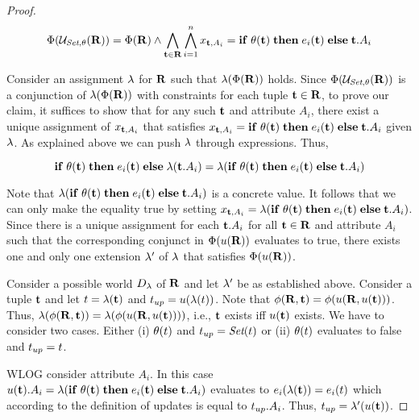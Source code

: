 {\begin{proof}
\begin{align}
  \label{}
\Phi(\mathcal{U}_{\textit{Set},\theta}(\mathbf{R})) = \Phi(\mathbf{R}) \land \bigwedge_{\mathbf{t} \in \mathbf{R}} \bigwedge_{i=1}^{n} x_{\mathbf{t},A_i} = \mathbf{if}\thickspace \theta(\mathbf{t}) \thickspace \mathbf{then} \thickspace e_i(\mathbf{t}) \thickspace \mathbf{else} \thickspace \mathbf{t}.A_i
\end{align}

Consider an assignment $\lambda$ for $\mathbf{R}$ such that $\lambda(\Phi(\mathbf{R}))$ holds. Since $\Phi(\mathcal{U}_{\textit{Set},\theta}(\mathbf{R}))$ is a conjunction of $\lambda(\Phi(\mathbf{R}))$ with constraints for each tuple $\mathbf{t} \in \mathbf{R}$, to prove our claim, it suffices to show that for any such $\mathbf{t}$ and attribute $A_i$, there exist a unique assignment of $x_{\mathbf{t},A_i}$ that satisfies $x_{\mathbf{t},A_i} = \mathbf{if}\thickspace \theta(\mathbf{t}) \thickspace \mathbf{then} \thickspace e_i(\mathbf{t}) \thickspace \mathbf{else} \thickspace \mathbf{t}.A_i$ given $\lambda$. As explained above we can push $\lambda$ through expressions. Thus,

\[
  \mathbf{if}\thickspace \theta(\mathbf{t}) \thickspace \mathbf{then} \thickspace e_i(\mathbf{t}) \thickspace \mathbf{else} \thickspace \lambda(\mathbf{t}.A_i) = \lambda(\mathbf{if}\thickspace \theta(\mathbf{t}) \thickspace \mathbf{then} \thickspace e_i(\mathbf{t}) \thickspace \mathbf{else} \thickspace \mathbf{t}.A_i)
\]

Note that $\lambda(\mathbf{if}\thickspace \theta(\mathbf{t}) \thickspace \mathbf{then} \thickspace e_i(\mathbf{t}) \thickspace \mathbf{else} \thickspace \mathbf{t}.A_i)$ is a concrete value. It follows that we can only make the equality true by setting $x_{\mathbf{t},A_i} = \lambda(\mathbf{if}\thickspace \theta(\mathbf{t}) \thickspace \mathbf{then} \thickspace e_i(\mathbf{t}) \thickspace \mathbf{else} \thickspace \mathbf{t}.A_i)$. Since there is a unique assignment for each $\mathbf{t}.A_i$ for all $\mathbf{t} \in \mathbf{R}$ and attribute $A_i$ such that the corresponding conjunct in $\Phi(u(\mathbf{R}))$ evaluates to true, there exists one and only one extension $\lambda'$ of $\lambda$ that satisfies $\Phi(u(\mathbf{R}))$.

Consider a possible world $D_{\lambda}$ of $\mathbf{R}$ and let $\lambda'$ be as established above. Consider a tuple $\mathbf{t}$ and let $t = \lambda(\mathbf{t})$ and $t_{up} = u(\lambda(t))$. Note that $\phi(\mathbf{R},\mathbf{t}) = \phi(u(\mathbf{R},u(\mathbf{t})))$. Thus, $\lambda(\phi(\mathbf{R},\mathbf{t})) = \lambda(\phi(u(\mathbf{R},u(\mathbf{t}))))$, i.e., $\mathbf{t}$ exists iff $u(\mathbf{t})$ exists.
We have to consider two cases. Either (i) $\theta(t)$ and $t_{up} = \textit{Set}(t)$ or (ii) $\theta(t)$ evaluates to false and $t_{up} = t$.

WLOG consider attribute $A_i$. In this case $u(\mathbf{t}).A_i = \lambda(\mathbf{if}\thickspace \theta(\mathbf{t}) \thickspace \mathbf{then} \thickspace e_i(\mathbf{t}) \thickspace \mathbf{else} \thickspace \mathbf{t}.A_i)$ evaluates to $e_i(\lambda(\mathbf{t})) = e_i(t)$ which according to the definition of updates is equal to $t_{up}.A_i$. Thus, $t_{up} = \lambda'(u(\mathbf{t}))$.


\end{proof}}
